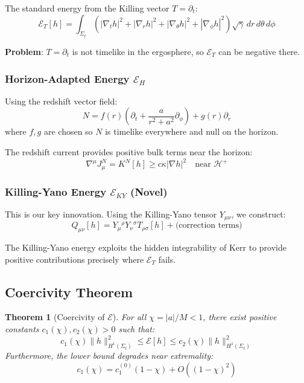 \documentclass[12pt,a4paper]{article}
\newtheorem{theorem}{Theorem}[section]
\begin{document}
The standard energy from the Killing vector $T = \partial_t$:
\begin{equation}
\mathcal{E}_T[h] = \int_{\Sigma_t} \left(|\nabla_t h|^2 + |\nabla_r h|^2 + |\nabla_\theta h|^2 + |\nabla_\phi h|^2\right) \sqrt{\gamma}\, dr\, d\theta\, d\phi
\end{equation}

\textbf{Problem}: $T = \partial_t$ is not timelike in the ergosphere, so $\mathcal{E}_T$ can be negative there.

\subsubsection{Horizon-Adapted Energy $\mathcal{E}_H$}

Using the redshift vector field:
\begin{equation}
N = f(r)\left(\partial_t + \frac{a}{r^2 + a^2}\partial_\phi\right) + g(r)\partial_r
\end{equation}
where $f, g$ are chosen so $N$ is timelike everywhere and null on the horizon.

The redshift current provides positive bulk terms near the horizon:
\begin{equation}
\nabla^\mu J^N_\mu = K^N[h] \geq c \kappa |\nabla h|^2 \quad \text{near } \mathcal{H}^+
\end{equation}

\subsubsection{Killing-Yano Energy $\mathcal{E}_{KY}$ (Novel)}

This is our key innovation. Using the Killing-Yano tensor $Y_{\mu\nu}$, we construct:
\begin{equation}
Q_{\mu\nu}[h] = Y_{\mu}{}^\rho Y_{\nu}{}^\sigma T_{\rho\sigma}[h] + \text{(correction terms)}
\end{equation}

The Killing-Yano energy exploits the hidden integrability of Kerr to provide positive contributions precisely where $\mathcal{E}_T$ fails.

\subsection{Coercivity Theorem}

\begin{theorem}[Coercivity of $\mathcal{E}$]\label{thm:coercivity}
For all $\chi = |a|/M < 1$, there exist positive constants $c_1(\chi), c_2(\chi) > 0$ such that:
\begin{equation}
c_1(\chi)\|h\|_{H^1(\Sigma_t)}^2 \leq \mathcal{E}[h] \leq c_2(\chi)\|h\|_{H^1(\Sigma_t)}^2
\end{equation}
Furthermore, the lower bound degrades near extremality:
\begin{equation}
c_1(\chi) = c_1^{(0)}(1 - \chi) + O((1-\chi)^2)
\end{equation}
\end{theorem}
\end{document}
